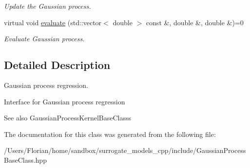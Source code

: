 \begin{DoxyCompactItemize}
\begin{DoxyCompactList}\small\item\em Update the Gaussian process. \end{DoxyCompactList}\item 
virtual void \hyperlink{class_gaussian_process_base_class_a898e92a3076ea21dd1b35ccd78d3e2bc}{evaluate} (std\+::vector$<$ double $>$ const \&, double \&, double \&)=0\hypertarget{class_gaussian_process_base_class_a898e92a3076ea21dd1b35ccd78d3e2bc}{}\label{class_gaussian_process_base_class_a898e92a3076ea21dd1b35ccd78d3e2bc}

\begin{DoxyCompactList}\small\item\em Evaluate Gaussian process. \end{DoxyCompactList}\end{DoxyCompactItemize}


\subsection{Detailed Description}
Gaussian process regression. 

Interface for Gaussian process regression \begin{DoxySeeAlso}{See also}
Gaussian\+Process\+Kernel\+Base\+Classs 
\end{DoxySeeAlso}


The documentation for this class was generated from the following file\+:\begin{DoxyCompactItemize}
\item 
/\+Users/\+Florian/home/sandbox/surrogate\+\_\+models\+\_\+cpp/include/Gaussian\+Process\+Base\+Class.\+hpp\end{DoxyCompactItemize}
